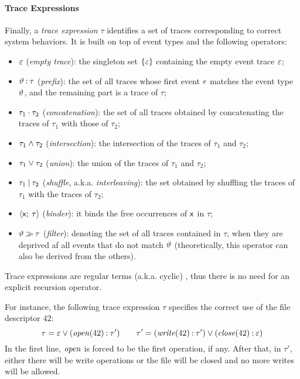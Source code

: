
\paragraph{Trace Expressions}
Finally, a \emph{trace expression} \(\tau\) identifies a set of traces corresponding to correct system behaviors. It is built on top of event types and the following operators:
\begin{itemize}
	\item $\varepsilon$ (\emph{empty trace}): the singleton set $\{\varepsilon\}$ containing  the empty event trace $\varepsilon$;
	\item $\vartheta\mathbin{:}\tau$ (\emph{prefix}): the set of all traces whose first event $e$ matches the event type $\vartheta$, and the remaining part is a trace of $\tau$;
	\item $\tau_1\mathbin{\cdot}\tau_2$ (\emph{concatenation}): the set of all traces obtained by concatenating the traces of $\tau_1$ with those of $\tau_2$; 
	\item $\tau_1\mathbin{\wedge} \tau_2$ (\emph{intersection}): the intersection of the traces of $\tau_1$ and $\tau_2$;
	\item $\tau_1\mathbin{\vee} \tau_2$ (\emph{union}): the union of the traces of $\tau_1$ and $\tau_2$; 
	\item $\tau_1\mathbin{|} \tau_2$ (\emph{shuffle}, a.k.a. \emph{interleaving}): the set obtained by shuffling the traces of $\tau_1$ with the traces of $\tau_2$;
	\item ${\langle}\mathsf{x};\:{\tau}{\rangle}$ (\emph{binder}): it binds the free occurrences of $\mathsf{x}$ in $\tau$;
	\item $\vartheta\mathbin{\gg}\tau$ (\emph{filter}):
	denoting the set of all traces contained in $\tau$, when they are deprived af all events that do not match $\vartheta$ (theoretically, this operator can also be derived from the others).
\end{itemize}

Trace expressions are regular terms (a.k.a. cyclic) \cite{Courcelle83}, thus there is no need for an explicit recursion operator.

For instance, the following trace expression \(\tau\) specifies the correct use of the file descriptor \(42\):
$$
	\tau = \varepsilon \mathbin{\vee} (\mathit{open}(42) \mathbin{:} \tau')\qquad
	\tau' = (\mathit{write}(42) \mathbin{:} \tau') \mathbin{\vee} (\mathit{close}(42) \mathbin{:} \varepsilon)
$$
In the first line, \(\mathit{open}\) is forced to be the first operation, if any.
After that, in \(\tau'\), either there will be write operations or the file will be closed and no more writes will be allowed.

